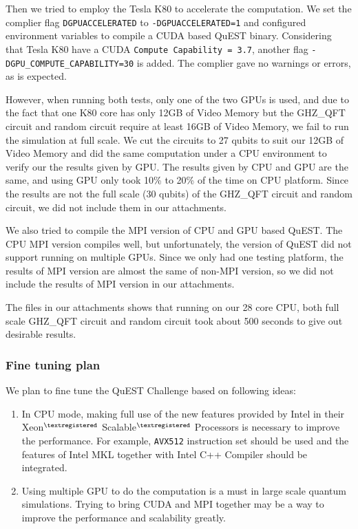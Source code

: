 \documentclass[a4paper, 11pt]{article}
\begin{document}
				Then we tried to employ the Tesla K80 to accelerate the computation. We set the complier flag \texttt{DGPUACCELERATED} to \texttt{-DGPUACCELERATED=1} and configured environment variables to compile a CUDA based QuEST binary. Considering that Tesla K80 have a CUDA \texttt{Compute Capability = 3.7}, another flag \texttt{-DGPU\_COMPUTE\_CAPABILITY=30} is added. The complier gave no warnings or errors, as is expected.
				
				However, when running both tests, only one of the two GPUs is used, and due to the fact that one K80 core has only 12GB of Video Memory but the GHZ\_QFT circuit and random circuit require at least 16GB of Video Memory, we fail to run the simulation at full scale. We cut the circuits to 27 qubits to suit our 12GB of Video Memory and did the same computation under a CPU environment to verify our the results given by GPU. The results given by CPU and GPU are the same, and using GPU only took 10\% to 20\% of the time on CPU platform. Since the results are not the full scale (30 qubits) of the GHZ\_QFT circuit and random circuit, we did not include them in our attachments.
				
				We also tried to compile the MPI version of CPU and GPU based QuEST. The CPU MPI version compiles well, but unfortunately, the  version of QuEST did not support running on multiple GPUs. Since we only had one testing platform, the results of MPI version are almost the same of non-MPI version, so we did not include the results of MPI version in our attachments.
				
				The files in our attachments shows that running on our 28 core CPU, both full scale GHZ\_QFT circuit and random circuit took about 500 seconds to give out desirable results.

			
			\subsubsection{Fine tuning plan}
				
				We plan to fine tune the QuEST Challenge based on following ideas:
				
				\begin{enumerate}
					\item In CPU mode, making full use of the new features provided by Intel in their Xeon$^{\tiny{\textregistered}}$ Scalable$^{\tiny{\textregistered}}$ Processors is necessary to improve the performance. For example, \texttt{AVX512} instruction set should be used and the features of Intel MKL together with Intel C++ Compiler should be integrated.
					\item Using multiple GPU to do the computation is a must in large scale quantum simulations. Trying to bring CUDA and MPI together may be a way to improve the performance and scalability greatly.
				\end{enumerate}
\end{document}
